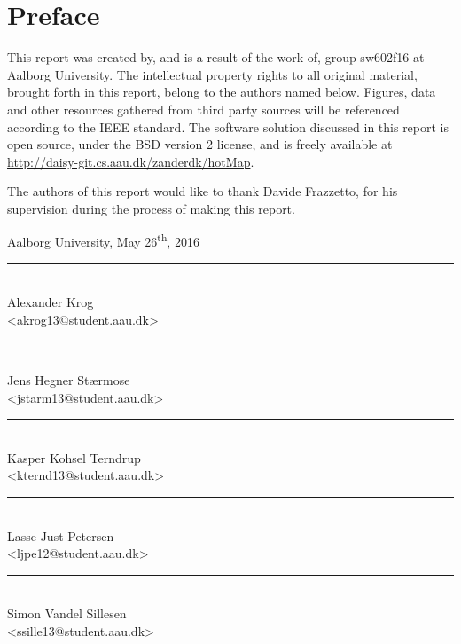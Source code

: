 \chapter*{Preface}\label{ch:preface}
This report was created by, and is a result of the work of, group sw602f16 at Aalborg University. The intellectual property rights to all original material, brought forth in this report, belong to the authors named below. Figures, data and other resources gathered from third party sources will be referenced according to the IEEE standard.
The software solution discussed in this report is open source, under the BSD version 2 license, and is freely available at \url{http://daisy-git.cs.aau.dk/zanderdk/hotMap}.\\

The authors of this report would like to thank Davide Frazzetto, for his supervision during the process of making this report.

\vspace{\baselineskip}\hfill Aalborg University, May 26\textsuperscript{th}, 2016
\vfill

\noindent
\begin{minipage}[b]{0.45\textwidth}
 \centering
 \rule{\textwidth}{0.5pt}\\
  Alexander Krog\\
 {\footnotesize <akrog13@student.aau.dk>}
\end{minipage}
%
\hfill
%
\begin{minipage}[b]{0.45\textwidth}
 \centering
 \rule{\textwidth}{0.5pt}\\
  Jens Hegner Stærmose\\
 {\footnotesize <jstarm13@student.aau.dk>}
\end{minipage}
%
\vspace{3\baselineskip}

\noindent
\begin{minipage}[b]{0.45\textwidth}
 \centering
 \rule{\textwidth}{0.5pt}\\
  Kasper Kohsel Terndrup\\
 {\footnotesize <kternd13@student.aau.dk>}
\end{minipage}
%
\hfill
%
\begin{minipage}[b]{0.45\textwidth}
 \centering
 \rule{\textwidth}{0.5pt}\\
  Lasse Just Petersen\\
 {\footnotesize <ljpe12@student.aau.dk>}
\end{minipage}
\vspace{3\baselineskip}

\noindent
\begin{center}
\begin{minipage}[b]{0.45\textwidth}
 \centering
 \rule{\textwidth}{0.5pt}\\
  Simon Vandel Sillesen\\
 {\footnotesize <ssille13@student.aau.dk>}
\end{minipage}
\end{center}
%
\hfill
%